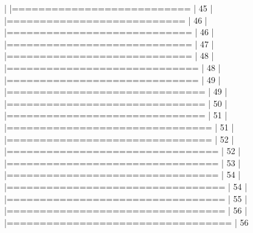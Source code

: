 \documentclass[article,nojss]{jss} %
\begin{document}
\begin{Schunk}
\begin{Soutput}
  |                                                                  
  |===========================                                 |  45%
  |                                                                  
  |===========================                                 |  46%
  |                                                                  
  |============================                                |  46%
  |                                                                  
  |============================                                |  47%
  |                                                                  
  |============================                                |  48%
  |                                                                  
  |=============================                               |  48%
  |                                                                  
  |=============================                               |  49%
  |                                                                  
  |==============================                              |  49%
  |                                                                  
  |==============================                              |  50%
  |                                                                  
  |==============================                              |  51%
  |                                                                  
  |===============================                             |  51%
  |                                                                  
  |===============================                             |  52%
  |                                                                  
  |================================                            |  52%
  |                                                                  
  |================================                            |  53%
  |                                                                  
  |================================                            |  54%
  |                                                                  
  |=================================                           |  54%
  |                                                                  
  |=================================                           |  55%
  |                                                                  
  |=================================                           |  56%
  |                                                                  
  |==================================                          |  56%

\end{Soutput}
\end{Schunk}
\end{document}
